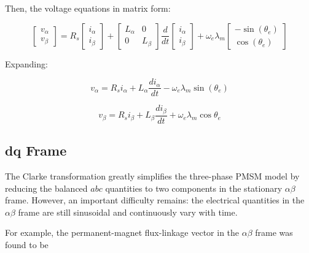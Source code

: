 \documentclass{article}
\begin{document}
Then, the voltage equations in matrix form:

\begin{equation}
    \begin{bmatrix}
        v_\alpha \\
        v_\beta
    \end{bmatrix}
    =
    R_s
    \begin{bmatrix}
        i_\alpha \\
        i_\beta
    \end{bmatrix}
    +
    \begin{bmatrix}
        L_\alpha & 0 \\
        0 & L_\beta
    \end{bmatrix}
    \frac{d}{dt}
    \begin{bmatrix}
        i_\alpha \\
        i_\beta
    \end{bmatrix}
    +
    \omega_e\lambda_m
    \begin{bmatrix}
        -\sin(\theta_e) \\
        \cos(\theta_e)
    \end{bmatrix}
\end{equation}

Expanding:

\begin{equation}
    v_\alpha = R_si_\alpha + L_\alpha\frac{di_\alpha}{dt} - \omega_e\lambda_m\sin(\theta_e)
\end{equation}

\begin{equation}
    v_\beta = R_si_\beta + L_\beta\frac{di_\beta}{dt} + \omega_e\lambda_m\cos{\theta_e}
\end{equation}


\subsection{dq Frame}

The Clarke transformation greatly simplifies the three-phase PMSM model by reducing the balanced $abc$ quantities to two components in the stationary $\alpha\beta$ frame. However, an important difficulty remains: the electrical quantities in the $\alpha\beta$ frame are still sinusoidal and continuously vary with time.

For example, the permanent-magnet flux-linkage vector in the $\alpha\beta$ frame was found to be
\end{document}
